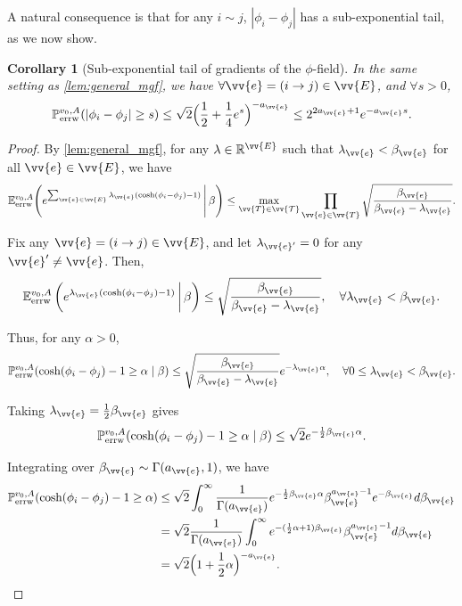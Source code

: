 \documentclass[a4paper, 11pt]{article}
\renewcommand{\P}{\mathbb{P}}
\newcommand{\E}{\mathbb{E}}
\newcommand{\Eerrw}{\E_{\textnormal{errw}}}
\newcommand{\Perrw}{\P_{\textnormal{errw}}}
\newtheorem{cor}[thm]{Corollary}
\begin{document}
A natural consequence is that for any $i\sim j$, $|\phi_i-\phi_j|$ has a sub-exponential tail, as we now show.

\vspace{0.3em}
\begin{cor}[Sub-exponential tail of gradients of the $\phi$-field]
\label{cor:grad_subexp}
In the same setting as \cref{lem:general_mgf}, we have \( \forall \vv{e}=(i\to j)\in \vv{E} \), and \( \forall s > 0 \),
\[
\Perrw^{v_0,A}(|\phi_i - \phi_j| \geq s) \leq \sqrt{2} \Big(\frac{1}{2} + \frac{1}{4} e^s \Big)^{-a_{\vv{e}}} \leq 2^{2a_{\vv{e}}+1} e^{-a_{\vv{e}} s}.
\]
\end{cor}

\begin{proof}
By \cref{lem:general_mgf}, for any \( \lambda \in \mathbb{R}^{\vv{E}} \) such that \( \lambda_{\vv{e}} < \beta_{\vv{e}} \) for all \( \vv{e} \in \vv{E} \), we have
\[
\Eerrw^{v_0,A}\Bigg(e^{\sum_{\vv{e} \in \vv{E}} \lambda_{\vv{e}}(\cosh(\phi_i - \phi_j) - 1)} \, \Bigg| \, \beta \Bigg) \leq \max_{\vv{T} \in \vv{\mathcal{T}}} \prod_{\vv{e} \in \vv{T}} \sqrt{\frac{\beta_{\vv{e}}}{\beta_{\vv{e}} - \lambda_{\vv{e}}}}.
\]

Fix any \( \vv{e} = (i \to j) \in \vv{E} \), and let \( \lambda_{\vv{e}'} = 0 \) for any \( \vv{e}' \neq \vv{e} \). Then, 
\[
\Eerrw^{v_0,A}\left(e^{\lambda_{\vv{e}}(\cosh(\phi_i - \phi_j) - 1)} \,\bigg|\, \beta \right) \leq \sqrt{\frac{\beta_{\vv{e}}}{\beta_{\vv{e}} - \lambda_{\vv{e}}}}, \quad \forall \lambda_{\vv{e}} < \beta_{\vv{e}}.
\]

Thus, for any $\alpha>0$,
\[
\Perrw^{v_0,A}(\cosh(\phi_i - \phi_j) - 1 \geq \alpha \mid \beta) \leq \sqrt{\frac{\beta_{\vv{e}}}{\beta_{\vv{e}} - \lambda_{\vv{e}}}} e^{-\lambda_{\vv{e}} \alpha}, \quad \forall 0 \le \lambda_{\vv{e}} < \beta_{\vv{e}}.
\]

Taking \( \lambda_{\vv{e}} = \frac{1}{2} \beta_{\vv{e}} \) gives
\[
\Perrw^{v_0,A}(\cosh(\phi_i - \phi_j) - 1 \geq \alpha \mid \beta) \leq \sqrt{2} e^{-\frac{1}{2} \beta_{\vv{e}} \alpha}.
\] 

Integrating over \( \beta_{\vv{e}} \sim \Gamma(a_{\vv{e}}, 1) \), we have
\begin{equation*}
\begin{aligned}
\Perrw^{v_0,A}(\cosh(\phi_i - \phi_j) - 1 \geq \alpha)
&\leq \sqrt{2} \int_0^\infty \frac{1}{\Gamma(a_{\vv{e}})} e^{-\frac{1}{2} \beta_{\vv{e}} \alpha} \beta_{\vv{e}}^{a_{\vv{e}} - 1} e^{-\beta_{\vv{e}}} d\beta_{\vv{e}} \\
&= \sqrt{2} \frac{1}{\Gamma(a_{\vv{e}})} \int_0^\infty e^{-(\frac{1}{2} \alpha + 1) \beta_{\vv{e}}} \beta_{\vv{e}}^{a_{\vv{e}} - 1} d\beta_{\vv{e}} \\
&= \sqrt{2} \Big( 1 + \frac{1}{2} \alpha \Big)^{-a_{\vv{e}}}.
\end{aligned}
\end{equation*}


\end{proof}
\end{document}
